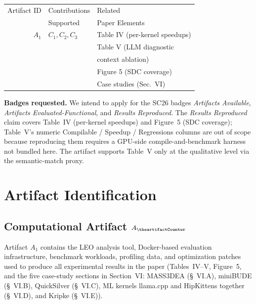 \documentclass[conference]{IEEEtran}
\renewcommand{\newartifact}{%
    \stepcounter{artifactCounter}%
    \subsection{Computational Artifact
        \texorpdfstring{$A_{\theartifactCounter}$}{A\theartifactCounter}}%
}
\begin{document}
\begin{center}
{\setlength{\tabcolsep}{3pt}
\begin{tabular}{rll}
\toprule
Artifact ID  &  Contributions &  Related \\
             &  Supported     &  Paper Elements \\
\midrule
$A_1$   &  $C_1, C_2, C_3$ & Table IV (per-kernel speedups) \\
        &                   & Table V (LLM diagnostic \\
        &                   & \quad context ablation) \\
        &                   & Figure 5 (SDC coverage) \\
        &                   & Case studies (Sec.~VI) \\
\bottomrule
\end{tabular}}
\end{center}

\bigskip
\noindent\textbf{Badges requested.} We intend to apply for the SC26 badges \emph{Artifacts Available}, \emph{Artifacts Evaluated-Functional}, and \emph{Results Reproduced}. The \emph{Results Reproduced} claim covers Table~IV (per-kernel speedups) and Figure~5 (SDC coverage); Table~V's numeric Compilable / Speedup / Regressions columns are out of scope because reproducing them requires a GPU-side compile-and-benchmark harness not bundled here. The artifact supports Table~V only at the qualitative level via the  semantic-match proxy.

\section{Artifact Identification}

\newartifact

\artrel

Artifact $A_1$ contains the LEO analysis tool, Docker-based evaluation infrastructure, benchmark workloads, profiling data, and optimization patches used to produce all experimental results in the paper (Tables~IV--V, Figure~5, and the five case-study sections in Section~VI: MASS3DEA (\S~VI.A), miniBUDE (\S~VI.B), QuickSilver (\S~VI.C), ML kernels llama.cpp and HipKittens together (\S~VI.D), and Kripke (\S~VI.E)).

\artexp
\end{document}
